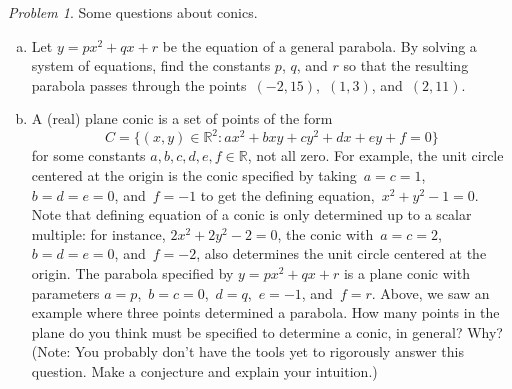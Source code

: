 \documentclass[11pt,twoside]{amsart}
\theoremstyle{plain}
\theoremstyle{remark}
\newtheorem{prob}{Problem}
\theoremstyle{definition}
\theoremstyle{definition}
\newcommand{\RR}{\mathbb{R}}
\begin{document}

\begin{prob}
Some questions about conics.
\begin{enumerate}[(a)]
\item Let $y=px^2+qx+r$ be the equation of a general parabola.  By solving a system of equations, find the constants $p$, $q$, and $r$ so that the resulting parabola passes through the points~$(-2,15)$,~$(1,3)$, and~$(2,11)$.
\item A (real) plane conic is a set of points of the form \[   C=\{(x,y)\in\RR^2:ax^2+bxy+cy^2+dx+ey+f=0\} \] for some constants $a,b,c,d,e,f\in\RR$, not all zero. For example, the unit circle centered at the origin is the conic specified by taking~$a=c=1$,~$b=d=e=0$, and~$f=-1$ to get the defining equation,~$x^2+y^2-1=0$.  Note that defining equation of a conic is only determined up to a scalar multiple: for instance, $2x^2+2y^2-2=0$, the conic with~$a=c=2$,~$b=d=e=0$, and~$f=-2$, also determines the unit circle centered at the origin. The parabola specified by $y=px^2+qx+r$ is a plane conic with parameters $a=p$,~$b=c=0$,~$d=q$,~$e=-1$, and~$f=r$.  Above, we saw an example where three points determined a parabola.  How many points in the plane do you think must be specified to determine a conic, in general? Why? (Note: You probably don't have the tools yet to rigorously answer this question. Make a conjecture and explain your intuition.)
\end{enumerate}
\end{prob}
\end{document}
